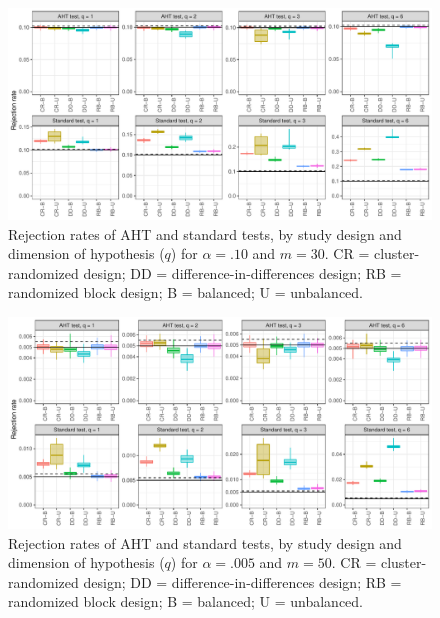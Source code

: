 \documentclass[12pt]{article}
\begin{document}
\begin{landscape}
\begin{figure}[p]
{\centering \includegraphics[width=\linewidth]{CR_fig/balance_10_30-1} 

}

\caption{Rejection rates of AHT and standard tests, by study design and dimension of hypothesis ($q$) for $\alpha = .10$ and $m = 30$. CR = cluster-randomized design; DD = difference-in-differences design; RB = randomized block design; B = balanced; U = unbalanced.}\label{fig:balance_10_30}
\end{figure}

\begin{figure}[p]

{\centering \includegraphics[width=\linewidth]{CR_fig/balance_005_50-1} 

}

\caption{Rejection rates of AHT and standard tests, by study design and dimension of hypothesis ($q$) for $\alpha = .005$ and $m = 50$. CR = cluster-randomized design; DD = difference-in-differences design; RB = randomized block design; B = balanced; U = unbalanced.}\label{fig:balance_005_50}
\end{figure}

\begin{figure}[p]


\end{figure}
\end{landscape}
\end{document}
